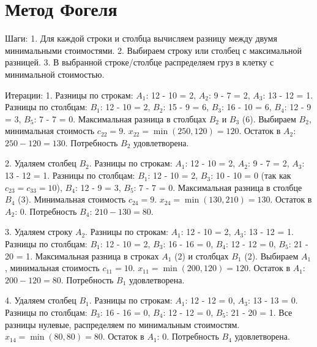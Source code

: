 \documentclass{article}
\begin{document}
\section{Метод Фогеля}

Шаги:  
1. Для каждой строки и столбца вычисляем разницу между двумя минимальными стоимостями.  
2. Выбираем строку или столбец с максимальной разницей.  
3. В выбранной строке/столбце распределяем груз в клетку с минимальной стоимостью.  

Итерации:  
1. Разницы по строкам:  
   \( A_1 \): 12 - 10 = 2,  
   \( A_2 \): 9 - 7 = 2,  
   \( A_3 \): 13 - 12 = 1.  
   Разницы по столбцам:  
   \( B_1 \): 12 - 10 = 2,  
   \( B_2 \): 15 - 9 = 6,  
   \( B_3 \): 16 - 10 = 6,  
   \( B_4 \): 12 - 9 = 3,  
   \( B_5 \): 7 - 7 = 0.  
   Максимальная разница в столбцах \( B_2 \) и \( B_3 \) (6). Выбираем \( B_2 \), минимальная стоимость \( c_{22} = 9 \).  
   \( x_{22} = \min(250, 120) = 120 \).  
   Остаток в \( A_2 \): \( 250 - 120 = 130 \).  
   Потребность \( B_2 \) удовлетворена.  

2. Удаляем столбец \( B_2 \).  
   Разницы по строкам:  
   \( A_1 \): 12 - 10 = 2,  
   \( A_2 \): 9 - 7 = 2,  
   \( A_3 \): 13 - 12 = 1.  
   Разницы по столбцам:  
   \( B_1 \): 12 - 10 = 2,  
   \( B_3 \): 10 - 10 = 0 (так как \( c_{23} = c_{33} = 10 \)),  
   \( B_4 \): 12 - 9 = 3,  
   \( B_5 \): 7 - 7 = 0.  
   Максимальная разница в столбце \( B_4 \) (3). Минимальная стоимость \( c_{24} = 9 \).  
   \( x_{24} = \min(130, 210) = 130 \).  
   Остаток в \( A_2 \): 0.  
   Потребность \( B_4 \): \( 210 - 130 = 80 \).  

3. Удаляем строку \( A_2 \).  
   Разницы по строкам:  
   \( A_1 \): 12 - 10 = 2,  
   \( A_3 \): 13 - 12 = 1.  
   Разницы по столбцам:  
   \( B_1 \): 12 - 10 = 2,  
   \( B_3 \): 16 - 16 = 0,  
   \( B_4 \): 12 - 12 = 0,  
   \( B_5 \): 21 - 20 = 1.  
   Максимальная разница в строках \( A_1 \) (2) и столбцах \( B_1 \) (2). Выбираем \( A_1 \), минимальная стоимость \( c_{11} = 10 \).  
   \( x_{11} = \min(200, 120) = 120 \).  
   Остаток в \( A_1 \): \( 200 - 120 = 80 \).  
   Потребность \( B_1 \) удовлетворена.  

4. Удаляем столбец \( B_1 \).  
   Разницы по строкам:  
   \( A_1 \): 12 - 12 = 0,  
   \( A_3 \): 13 - 13 = 0.  
   Разницы по столбцам:  
   \( B_3 \): 16 - 16 = 0,  
   \( B_4 \): 12 - 12 = 0,  
   \( B_5 \): 21 - 20 = 1.  
   Все разницы нулевые, распределяем по минимальным стоимостям.  
   \( x_{14} = \min(80, 80) = 80 \).  
   Остаток в \( A_1 \): 0.  
   Потребность \( B_4 \) удовлетворена.  
\end{document}
